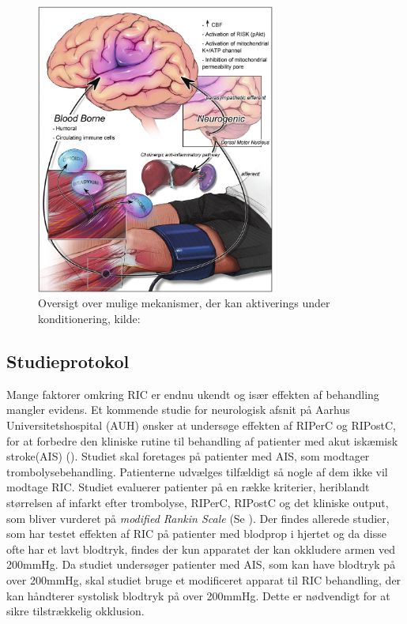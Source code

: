\begin{figure}[H]
	\centering
	\includegraphics[width = 0.7\textwidth]{billeder/konditioneringsmekanismer.png}
	\caption{Oversigt over mulige mekanismer, der kan aktiverings under konditionering, kilde: \cite{RefWorks:3}} \label{fig:mechanism}
\end{figure}

\subsection{Studieprotokol}\label{title:studieprotokold}
Mange faktorer omkring RIC er endnu ukendt og især effekten af behandling mangler evidens. Et kommende studie for neurologisk afsnit på Aarhus Universitetshospital (AUH) ønsker at undersøge effekten af RIPerC og RIPostC, for at forbedre den kliniske rutine til behandling af patienter med akut iskæmisk stroke(AIS) (\cite{RefWorks:39}). Studiet skal foretages på patienter med AIS, som modtager trombolysebehandling. Patienterne udvælges tilfældigt så nogle af dem ikke vil modtage RIC. Studiet evaluerer patienter på en række kriterier, heriblandt størrelsen af infarkt efter trombolyse, RIPerC, RIPostC og det kliniske output, som bliver vurderet på \textit{modified Rankin Scale} (Se \cite{Manual:1}). Der findes allerede studier, som har testet effekten af RIC på patienter med blodprop i hjertet og da disse ofte har et lavt blodtryk, findes der kun apparatet der kan okkludere armen ved 200mmHg. Da studiet undersøger patienter med AIS, som kan have blodtryk på over 200mmHg, skal studiet bruge et modificeret apparat til RIC behandling, der kan håndterer systolisk blodtryk på over 200mmHg. Dette er nødvendigt for at sikre tilstrækkelig okklusion.

